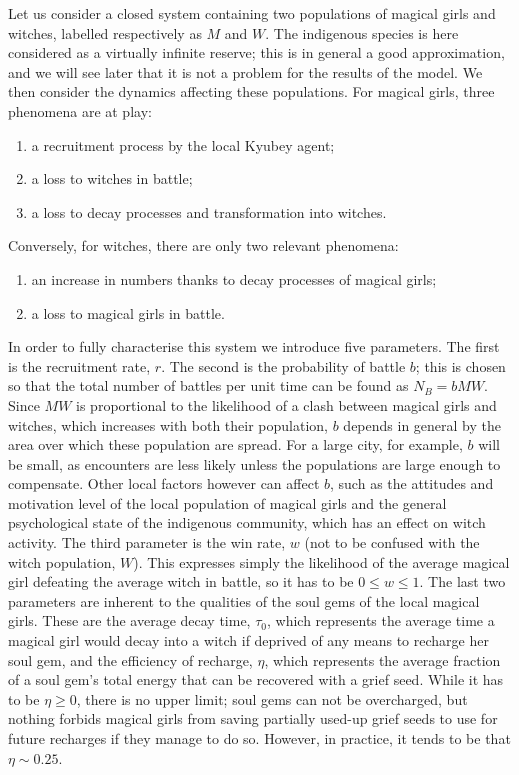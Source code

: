 \documentclass[]{article}
\begin{document}
Let us consider a closed system containing two populations of magical girls and witches, labelled respectively as $M$ and $W$. The indigenous species is here considered as a virtually infinite reserve; this is in general a good approximation, and we will see later that it is not a problem for the results of the model. We then consider the dynamics affecting these populations. For magical girls, three phenomena are at play:

\begin{enumerate}
	\item a recruitment process by the local Kyubey agent;
	\item a loss to witches in battle;
	\item a loss to decay processes and transformation into witches.
\end{enumerate}

Conversely, for witches, there are only two relevant phenomena:

\begin{enumerate}
	\item an increase in numbers thanks to decay processes of magical girls;
	\item a loss to magical girls in battle.
\end{enumerate}

In order to fully characterise this system we introduce five parameters. The first is the recruitment rate, $r$. The second is the probability of battle $b$; this is chosen so that the total number of battles per unit time can be found as $N_B = bMW$. Since $MW$ is proportional to the likelihood of a clash between magical girls and witches, which increases with both their population, $b$ depends in general by the area over which these population are spread. For a large city, for example, $b$ will be small, as encounters are less likely unless the populations are large enough to compensate. Other local factors however can affect $b$, such as the attitudes and motivation level of the local population of magical girls and the general psychological state of the indigenous community, which has an effect on witch activity.\newline
The third parameter is the win rate, $w$ (not to be confused with the witch population, $W$). This expresses simply the likelihood of the average magical girl defeating the average witch in battle, so it has to be $0 \leq w \leq 1$. The last two parameters are inherent to the qualities of the soul gems of the local magical girls. These are the average decay time, $\tau_0$, which represents the average time a magical girl would decay into a witch if deprived of any means to recharge her soul gem, and the efficiency of recharge, $\eta$, which represents the average fraction of a soul gem's total energy that can be recovered with a grief seed. While it has to be $\eta \geq 0$, there is no upper limit; soul gems can not be overcharged, but nothing forbids magical girls from saving partially used-up grief seeds to use for future recharges if they manage to do so. However, in practice, it tends to be that $\eta \sim 0.25$.\newline
\end{document}
